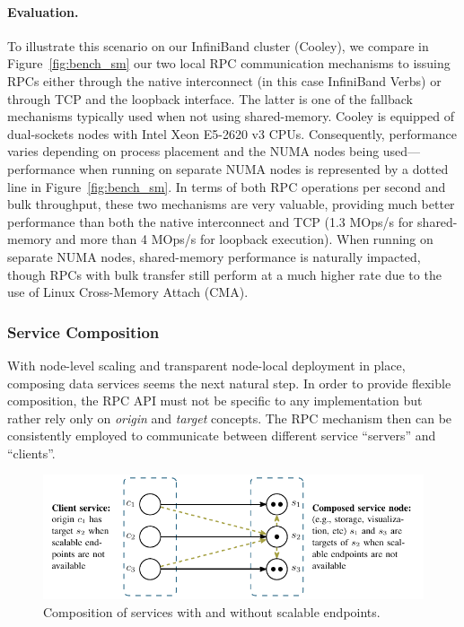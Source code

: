\documentclass[11pt]{article}
\begin{document}
\paragraph{Evaluation.} To illustrate this scenario on our InfiniBand cluster (Cooley),
we compare in  Figure~\ref{fig:bench_sm} our two local RPC communication mechanisms 
to issuing RPCs either through the native interconnect (in this case InfiniBand Verbs)
or through TCP and the loopback interface. The latter is one of the fallback 
mechanisms typically used when not using shared-memory.
Cooley is equipped of dual-sockets nodes with Intel Xeon E5-2620 v3 CPUs. Consequently,
performance varies depending on process placement and the NUMA nodes being used---performance when running on separate NUMA nodes is represented by a dotted line in Figure~\ref{fig:bench_sm}.
In terms of both RPC
operations per second and bulk throughput, these two mechanisms are very valuable,
providing much better performance than both the native interconnect and TCP
(1.3 MOps/s for shared-memory and more than 4 MOps/s for loopback execution).
When running on separate NUMA nodes, shared-memory performance is naturally
impacted, though RPCs with bulk transfer still perform at a much higher rate due to the use
of Linux Cross-Memory Attach (CMA).

\subsubsection{Service Composition}

With node-level scaling and transparent node-local deployment in place,
composing data services seems the next natural step. In order to provide flexible composition, 
the RPC API must not be specific to any implementation but rather rely only on \textit{origin} and
\textit{target} concepts. The RPC mechanism then can be consistently employed to communicate
between different service ``servers'' and ``clients''.

\begin{figure}[h]
\centering
\includegraphics{figs/composition}
\caption{Composition of services with and without scalable endpoints.}
\label{fig:composition}
\end{figure}
\end{document}
